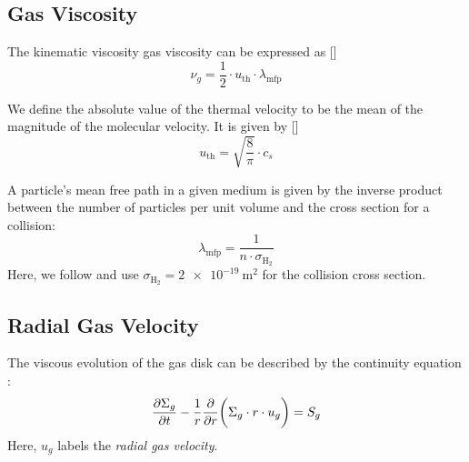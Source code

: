     \subsection{Gas Viscosity}

        The kinematic viscosity gas viscosity can be expressed as []
        \begin{equation}
            \nu_g = \frac{1}{2} \cdot u_\text{th} \cdot \lambda_\text{mfp}
        \end{equation}

        We define the absolute value of the thermal velocity to be the mean of the magnitude
        of the molecular velocity. It is given by []
        \begin{equation}
            u_\text{th} = \sqrt{\frac{8}{\pi}} \cdot c_s
        \end{equation}

        A particle's mean free path in a given medium is given by the inverse product between the 
        number of particles per unit volume and the cross section for a collision:
        \begin{equation}
            \lambda_\text{mfp} = \frac{1}{n \cdot \sigma_{\text{H}_2}}
        \end{equation}
        Here, we follow \cite{birnstiel_dullemond_brauer_2010} and use 
        $\sigma_{\text{H}_2} = \SI{2e-19}{\meter^2}$ for the collision cross section. \\


    \subsection{Radial Gas Velocity}


        The viscous evolution of the gas disk can be described by the continuity equation 
        \cite{birnstiel_dullemond_brauer_2010}:
        \begin{equation}
            \frac{\partial \Sigma_g}{\partial t}-\frac{1}{r}\frac{\partial }{\partial r}\bigg(\Sigma_g \cdot r \cdot u_g\bigg) = S_g
        \end{equation}
        Here, $u_g$ labels the \textit{radial gas velocity}.
        \\

